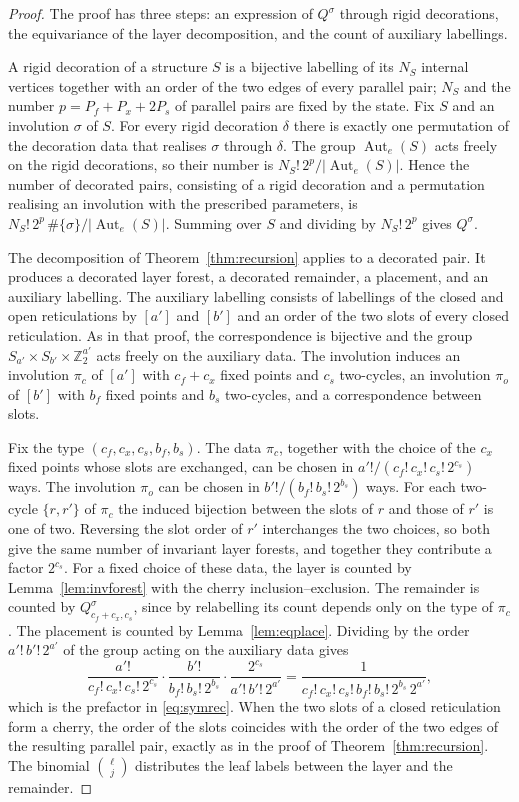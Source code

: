 \documentclass[11pt,a4paper]{article}
\theoremstyle{definition}
\newcommand{\Aut}{\operatorname{Aut}}
\begin{document}
\begin{proof}
The proof has three steps: an expression of $Q^\sigma$ through rigid decorations, the equivariance of the layer decomposition, and the count of auxiliary labellings.

A rigid decoration of a structure $S$ is a bijective labelling of its $N_S$ internal vertices together with an order of the two edges of every parallel pair; $N_S$ and the number $p=P_f+P_x+2P_s$ of parallel pairs are fixed by the state. Fix $S$ and an involution $\sigma$ of $S$. For every rigid decoration $\delta$ there is exactly one permutation of the decoration data that realises $\sigma$ through $\delta$. The group $\Aut_e(S)$ acts freely on the rigid decorations, so their number is $N_S!\,2^p/|\Aut_e(S)|$. Hence the number of decorated pairs, consisting of a rigid decoration and a permutation realising an involution with the prescribed parameters, is $N_S!\,2^p\,\#\{\sigma\}/|\Aut_e(S)|$. Summing over $S$ and dividing by $N_S!\,2^p$ gives $Q^\sigma$.

The decomposition of Theorem~\ref{thm:recursion} applies to a decorated pair. It produces a decorated layer forest, a decorated remainder, a placement, and an auxiliary labelling. The auxiliary labelling consists of labellings of the closed and open reticulations by $[a']$ and $[b']$ and an order of the two slots of every closed reticulation. As in that proof, the correspondence is bijective and the group $S_{a'}\times S_{b'}\times\mathbb{Z}_2^{a'}$ acts freely on the auxiliary data. The involution induces an involution $\pi_c$ of $[a']$ with $c_f+c_x$ fixed points and $c_s$ two-cycles, an involution $\pi_o$ of $[b']$ with $b_f$ fixed points and $b_s$ two-cycles, and a correspondence between slots.

Fix the type $(c_f,c_x,c_s,b_f,b_s)$. The data $\pi_c$, together with the choice of the $c_x$ fixed points whose slots are exchanged, can be chosen in $a'!/(c_f!\,c_x!\,c_s!\,2^{c_s})$ ways. The involution $\pi_o$ can be chosen in $b'!/(b_f!\,b_s!\,2^{b_s})$ ways. For each two-cycle $\{r,r'\}$ of $\pi_c$ the induced bijection between the slots of $r$ and those of $r'$ is one of two. Reversing the slot order of $r'$ interchanges the two choices, so both give the same number of invariant layer forests, and together they contribute a factor $2^{c_s}$. For a fixed choice of these data, the layer is counted by Lemma~\ref{lem:invforest} with the cherry inclusion--exclusion. The remainder is counted by $Q^\sigma_{c_f+c_x,c_s}$, since by relabelling its count depends only on the type of $\pi_c$. The placement is counted by Lemma~\ref{lem:eqplace}. Dividing by the order $a'!\,b'!\,2^{a'}$ of the group acting on the auxiliary data gives
\[
\frac{a'!}{c_f!\,c_x!\,c_s!\,2^{c_s}}\cdot\frac{b'!}{b_f!\,b_s!\,2^{b_s}}\cdot\frac{2^{c_s}}{a'!\,b'!\,2^{a'}}=\frac{1}{c_f!\,c_x!\,c_s!\,b_f!\,b_s!\,2^{b_s}\,2^{a'}},
\]
which is the prefactor in \eqref{eq:symrec}. When the two slots of a closed reticulation form a cherry, the order of the slots coincides with the order of the two edges of the resulting parallel pair, exactly as in the proof of Theorem~\ref{thm:recursion}. The binomial $\binom{\ell}{j}$ distributes the leaf labels between the layer and the remainder.


\end{proof}
\end{document}
